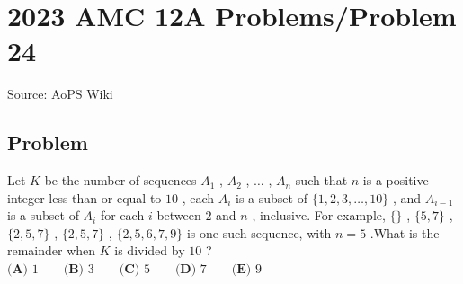 \documentclass[12pt]{article}
\begin{document}
\section*{{2023 AMC 12A Problems/Problem 24}}
Source: AoPS Wiki

\subsection*{Problem}
Let $K$ be the number of sequences $A_1$ , $A_2$ , $\dots$ , $A_n$ such that $n$ is a positive integer less than or equal to $10$ , each $A_i$ is a subset of $\{1, 2, 3, \dots, 10\}$ , and $A_{i-1}$ is a subset of $A_i$ for each $i$ between $2$ and $n$ , inclusive. For example, $\{\}$ , $\{5, 7\}$ , $\{2, 5, 7\}$ , $\{2, 5, 7\}$ , $\{2, 5, 6, 7, 9\}$ is one such sequence, with $n = 5$ .What is the remainder when $K$ is divided by $10$ ? $\textbf{(A) } 1 \qquad \textbf{(B) } 3 \qquad \textbf{(C) } 5 \qquad \textbf{(D) } 7 \qquad \textbf{(E) } 9$
\end{document}

